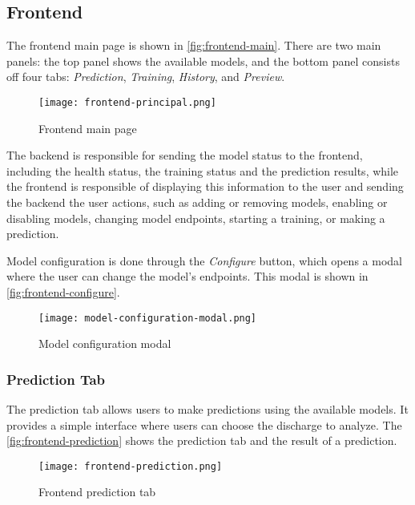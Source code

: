 \subsection{Frontend}

The frontend main page is shown in \autoref{fig:frontend-main}. There are two main panels: the top panel shows the available models, and the bottom panel consists off four tabs: \textit{Prediction}, \textit{Training}, \textit{History}, and \textit{Preview}.

\begin{figure}[H]
    \centering
    \texttt{[image: frontend-principal.png]}
    \caption{Frontend main page}
    \label{fig:frontend-main}
\end{figure}

The backend is responsible for sending the model status to the frontend, including the health status, the training status and the prediction results, while the frontend is responsible of displaying this information to the user and sending the backend the user actions, such as adding or removing models, enabling or disabling models, changing model endpoints, starting a training, or making a prediction.

Model configuration is done through the \textit{Configure} button, which opens a modal where the user can change the model's endpoints. This modal is shown in \autoref{fig:frontend-configure}.

\begin{figure}[H]
    \centering
    \texttt{[image: model-configuration-modal.png]}
    \caption{Model configuration modal}
    \label{fig:frontend-configure}
\end{figure}

\subsubsection{Prediction Tab}

The prediction tab allows users to make predictions using the available models. It provides a simple interface where users can choose the discharge to analyze. The \autoref{fig:frontend-prediction} shows the prediction tab and the result of a prediction.

\begin{figure}[H]
    \centering
    \texttt{[image: frontend-prediction.png]}
    \caption{Frontend prediction tab}
    \label{fig:frontend-prediction}
\end{figure}


